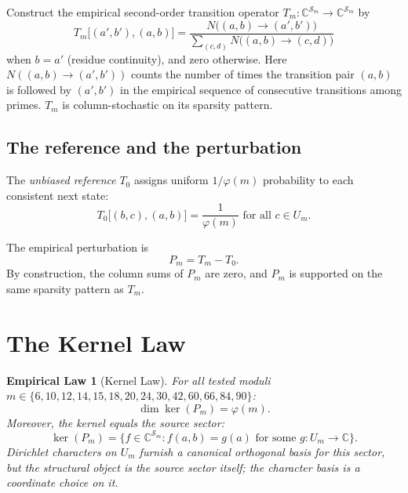 \documentclass[11pt,a4paper]{article}
\newtheorem*{emplaw}{Empirical Law}
\begin{document}
Construct the empirical second-order transition operator $T_m : \mathbb{C}^{\mathcal{S}_m} \to \mathbb{C}^{\mathcal{S}_m}$ by
\begin{equation}
T_m\bigl[(a',b'), (a,b)\bigr] = \frac{N\bigl((a,b) \to (a',b')\bigr)}{\sum_{(c,d)} N\bigl((a,b) \to (c,d)\bigr)}
\end{equation}
when $b = a'$ (residue continuity), and zero otherwise. Here $N((a,b) \to (a',b'))$ counts the number of times the transition pair $(a,b)$ is followed by $(a',b')$ in the empirical sequence of consecutive transitions among primes. $T_m$ is column-stochastic on its sparsity pattern.

\subsection{The reference and the perturbation}

The \emph{unbiased reference} $T_0$ assigns uniform $1/\varphi(m)$ probability to each consistent next state:
\begin{equation}
T_0\bigl[(b,c), (a,b)\bigr] = \frac{1}{\varphi(m)} \text{ for all } c \in U_m.
\end{equation}

The empirical perturbation is
\begin{equation}
P_m = T_m - T_0.
\end{equation}
By construction, the column sums of $P_m$ are zero, and $P_m$ is supported on the same sparsity pattern as $T_m$.

\section{The Kernel Law}
\label{sec:kernel}

\begin{emplaw}[Kernel Law]
\label{thm:kernel}
For all tested moduli $m \in \{6, 10, 12, 14, 15, 18, 20, 24, 30, 42, 60, 66, 84, 90\}$:
\begin{equation}
\dim \ker(P_m) = \varphi(m).
\end{equation}
Moreover, the kernel equals the \emph{source sector}:
\begin{equation}
\ker(P_m) = \bigl\{f \in \mathbb{C}^{\mathcal{S}_m} : f(a, b) = g(a) \text{ for some } g : U_m \to \mathbb{C}\bigr\}.
\end{equation}
Dirichlet characters on $U_m$ furnish a canonical orthogonal basis for this sector, but the structural object is the source sector itself; the character basis is a coordinate choice on it.
\end{emplaw}
\end{document}
